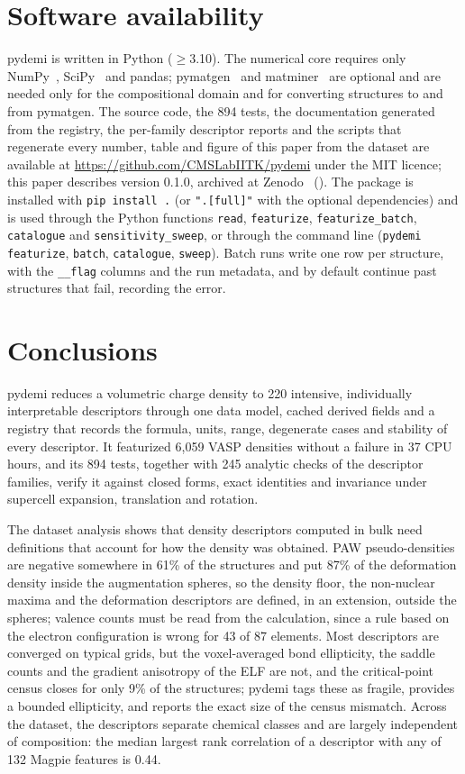 \documentclass[11pt,a4paper]{article}
\begin{document}
\section{Software availability}
pydemi is written in Python ($\geq$3.10). The numerical core requires only
NumPy~\cite{harris2020}, SciPy~\cite{virtanen2020} and pandas;
pymatgen~\cite{ong2013} and matminer~\cite{ward2018} are optional and are
needed only for the compositional domain and for converting structures to and
from pymatgen. The source code, the 894 tests, the
documentation generated from the registry, the per-family descriptor reports
and the scripts that regenerate every number, table and figure of this paper
from the dataset are available at
\url{https://github.com/CMSLabIITK/pydemi} under the MIT licence; this
paper describes version 0.1.0, archived at Zenodo~\cite{pydemi010}
(). The
package is installed with \texttt{pip install .} (or \texttt{".[full]"} with
the optional dependencies) and is used through the Python functions
\texttt{read}, \texttt{featurize}, \texttt{featurize\_batch},
\texttt{catalogue} and \texttt{sensitivity\_sweep}, or through the command line
(\texttt{pydemi featurize}, \texttt{batch}, \texttt{catalogue},
\texttt{sweep}). Batch runs write one row per structure, with the
\texttt{\_\_flag} columns and the run metadata, and by default continue past
structures that fail, recording the error.

\section{Conclusions}
\label{sec:conclusions}
pydemi reduces a volumetric charge density to 220 intensive, individually
interpretable descriptors through one data model, cached derived fields and a
registry that records the formula, units, range, degenerate cases and
stability of every descriptor. It featurized 6,059 VASP densities without a
failure in 37 CPU hours, and its 894 tests, together with 245 analytic checks
of the descriptor families, verify it against closed forms, exact identities
and invariance under supercell expansion, translation and rotation.

The dataset analysis shows that density descriptors computed in bulk need
definitions that account for how the density was obtained. PAW
pseudo-densities are negative somewhere in 61\% of the structures and put 87\%
of the deformation density inside the augmentation spheres, so the density
floor, the non-nuclear maxima and the deformation descriptors are defined, in
an extension, outside the spheres; valence counts must be read from the
calculation, since a rule based on the electron configuration is wrong for 43
of 87 elements. Most descriptors are converged on typical grids, but the
voxel-averaged bond ellipticity, the saddle counts and the gradient anisotropy
of the ELF are not, and the
critical-point census closes for only 9\% of the structures; pydemi tags these
as fragile, provides a bounded ellipticity, and reports the exact size of the
census mismatch. Across the dataset, the descriptors separate chemical classes
and are largely independent of composition: the median largest rank
correlation of a descriptor with any of 132 Magpie features is 0.44.
\end{document}
